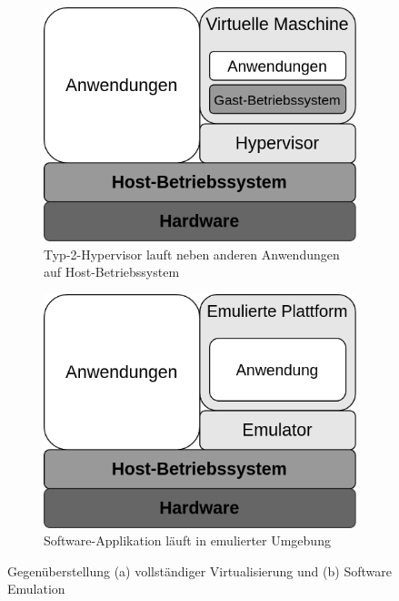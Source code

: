 \begin{figure}[h]
    \begin{subfigure}{0.5\textwidth}
        \includegraphics[width=0.9\linewidth]{anlagen/bilder/volle_Virtualisierung}
        \caption{Typ-2-Hypervisor lauft neben anderen Anwendungen auf
        Host-Betriebssystem}
        \label{fig:Volle_Virtualisierung}
    \end{subfigure}
    \hspace{1ex}
    \begin{subfigure}{0.5\textwidth}
        \includegraphics[width=0.9\linewidth]{anlagen/bilder/Software_Emulation}
        \caption{Software-Applikation läuft in emulierter Umgebung}
        \label{fig:Software_Emulation}
    \end{subfigure}
    \caption{Gegenüberstellung (a) vollständiger
    Virtualisierung\cite{VollVirtAbb_BSKompakt} und (b) Software
    Emulation\cite{SoftEmuAbb_BSKompakt}}
\end{figure}

